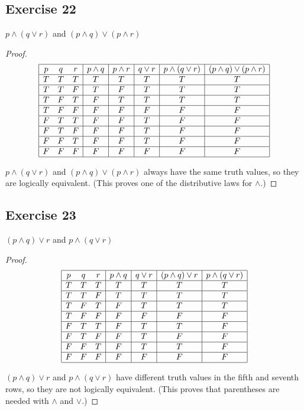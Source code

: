 \documentclass[14pt]{extarticle}
\begin{document}
\subsection{Exercise 22} $p \wedge (q \vee r)$ and $(p \wedge q) \vee (p \wedge
r)$

\begin{proof} $$ \begin{array}{|ccc|c|c|c|c|c|} \hline p & q & r & p \wedge q &
p \wedge r & q \vee r & p \wedge (q \vee r) & (p \wedge q) \vee (p \wedge r) \\
\hline T & T & T & T & T & T & T & T \\ \hline T & T & F & T & F & T & T & T \\
\hline T & F & T & F & T & T & T & T \\ \hline T & F & F & F & F & F & F & F \\
\hline F & T & T & F & F & T & F & F \\ \hline F & T & F & F & F & T & F & F \\
\hline F & F & T & F & F & T & F & F \\ \hline F & F & F & F & F & F & F & F \\
\hline \end{array} $$

$p \wedge (q \vee r)$ and $(p \wedge q) \vee (p \wedge r)$ always have the same
truth values, so they are logically equivalent. (This proves one of the
distributive laws for $\wedge$.) \end{proof}

\subsection{Exercise 23} $(p \wedge q) \vee r$ and $p \wedge (q \vee r)$
\begin{proof} $$ \begin{array}{|ccc|c|c|c|c|} \hline p & q & r & p \wedge q & q
\vee r & (p \wedge q) \vee r & p \wedge (q \vee r) \\\hline T & T & T & T & T &
T & T \\ \hline T & T & F & T & T & T & T \\ \hline T & F & T & F & T & T & T \\
\hline T & F & F & F & F & F & F \\ \hline F & T & T & F & T & T & F \\ \hline F
& T & F & F & T & F & F \\ \hline F & F & T & F & T & T & F \\ \hline F & F & F
& F & F & F & F \\ \hline \end{array} $$

$(p \wedge q) \vee r$ and $p \wedge (q \vee r)$ have different truth values in
the fifth and seventh rows, so they are not logically equivalent. (This proves
that parentheses are needed with $\wedge$ and $\vee$.) \end{proof}
\end{document}
